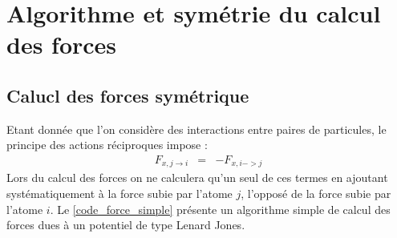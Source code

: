 \documentclass[11pt,a4paper,fleqn]{book}
\begin{document}

\section{Algorithme et symétrie du calcul des forces}

\subsection{Calucl des forces symétrique}

Etant donnée que l'on considère des interactions entre paires de particules,
le principe des actions réciproques impose :
%
\begin{eqnarray*}
	F_{x,j\rightarrow i} & = & - F_{x,i->j}
\end{eqnarray*}
%
Lors du calcul des forces on ne calculera qu'un seul de ces termes
en ajoutant systématiquement à la force subie par l'atome $j$, l'opposé
de la force subie par l'atome $i$. Le \ref{code_force_simple} présente
un algorithme simple de calcul des forces dues à un potentiel de type 
Lenard Jones.
\end{document}
